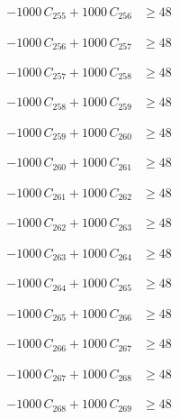 \documentclass[a4paper,11pt]{article}
\begin{document}
\begin{align}
-1000\,C_{255} + 1000\,C_{256} &\geq 48 \nonumber
\end{align}

\begin{align}
-1000\,C_{256} + 1000\,C_{257} &\geq 48 \nonumber
\end{align}

\begin{align}
-1000\,C_{257} + 1000\,C_{258} &\geq 48 \nonumber
\end{align}

\begin{align}
-1000\,C_{258} + 1000\,C_{259} &\geq 48 \nonumber
\end{align}

\begin{align}
-1000\,C_{259} + 1000\,C_{260} &\geq 48 \nonumber
\end{align}

\begin{align}
-1000\,C_{260} + 1000\,C_{261} &\geq 48 \nonumber
\end{align}

\begin{align}
-1000\,C_{261} + 1000\,C_{262} &\geq 48 \nonumber
\end{align}

\begin{align}
-1000\,C_{262} + 1000\,C_{263} &\geq 48 \nonumber
\end{align}

\begin{align}
-1000\,C_{263} + 1000\,C_{264} &\geq 48 \nonumber
\end{align}

\begin{align}
-1000\,C_{264} + 1000\,C_{265} &\geq 48 \nonumber
\end{align}

\begin{align}
-1000\,C_{265} + 1000\,C_{266} &\geq 48 \nonumber
\end{align}

\begin{align}
-1000\,C_{266} + 1000\,C_{267} &\geq 48 \nonumber
\end{align}

\begin{align}
-1000\,C_{267} + 1000\,C_{268} &\geq 48 \nonumber
\end{align}

\begin{align}
-1000\,C_{268} + 1000\,C_{269} &\geq 48 \nonumber
\end{align}
\end{document}
